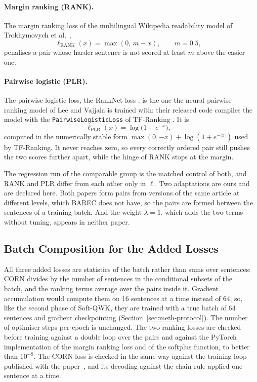\paragraph{Margin ranking (RANK).} The margin ranking loss of the multilingual Wikipedia
readability model of Trokhymovych et al.\ \cite{trokhymovych2024readability},
\begin{equation}
\ell_{\text{RANK}}(x) = \max(0,\, m - x), \qquad m = 0.5 ,
\end{equation}
penalises a pair whose harder sentence is not scored at least $m$ above the easier one.

\paragraph{Pairwise logistic (PLR).} The pairwise logistic loss, the RankNet loss
\cite{burges2005learning}, is the one the neural pairwise ranking model of Lee and Vajjala is
trained with: their released code compiles the model with the \texttt{PairwiseLogisticLoss} of
TF-Ranking \cite{lee2022neural}. It is
\begin{equation}
\ell_{\text{PLR}}(x) = \log\big(1+e^{-x}\big),
\end{equation}
computed in the numerically stable form $\max(0,-x)+\log(1+e^{-|x|})$ used by TF-Ranking. It
never reaches zero, so every correctly ordered pair still pushes the two scores further apart,
while the hinge of RANK stops at the margin.

The regression run of the comparable group is the matched control of both, and RANK and PLR
differ from each other only in $\ell$. Two adaptations are ours and are declared here. Both
papers form pairs from versions of the same article at different levels, which BAREC does not
have, so the pairs are formed between the sentences of a training batch. And the weight
$\lambda=1$, which adds the two terms without tuning, appears in neither paper.

\subsection{Batch Composition for the Added Losses}

All three added losses are statistics of the batch rather than sums over sentences: CORN divides
by the number of sentences in the conditional subsets of the batch, and the ranking terms average
over the pairs inside it. Gradient accumulation would compute them on 16 sentences at a time
instead of 64, so, like the second phase of Soft-QWK, they are trained with a true batch of 64
sentences and gradient checkpointing (Section~\ref{sec:meth-protocol}). The number of optimiser
steps per epoch is unchanged. The two ranking losses are checked before training against a
double loop over the pairs and against the PyTorch implementation of the margin ranking loss and
of the softplus function, to better than $10^{-9}$. The CORN loss is checked in the same way
against the training loop published with the paper~\cite{shi2023corn}, and its decoding against
the chain rule applied one sentence at a time.

